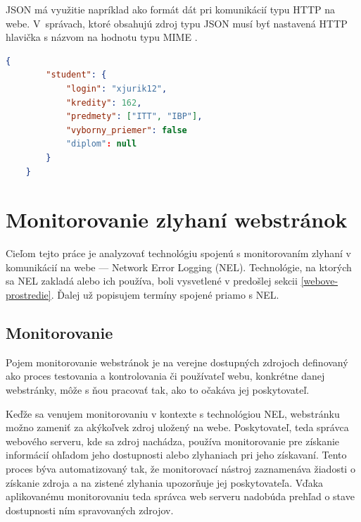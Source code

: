 JSON má využitie napríklad ako formát dát pri komunikácií typu HTTP na webe.
\mbox{V správach}, ktoré obsahujú zdroj typu JSON musí byť nastavená HTTP hlavička s názvom  na hodnotu typu MIME .

\begin{center}
\centering
\begin{lstlisting}[caption={\centering Príklad dokumentu JSON. Položka \code{"student"} predstavuje JSON kľúč, ktorého hodnotou je štruktúrovaný dátový typ objekt. Názornú ukážku dátového typu pole predstavuje hodnota priradená kľúču \code{"predmety"}.},
label=listing:priklad-dokumentu-json, 
language=json, 
frame=tb,
xleftmargin=.15\textwidth, 
xrightmargin=.15\textwidth]
    {       
        "student": {
            "login": "xjurik12",
            "kredity": 162,
            "predmety": ["ITT", "IBP"],
            "vyborny_priemer": false
            "diplom": null
        }
    }
\end{lstlisting}
\end{center}


\section{Monitorovanie zlyhaní webstránok}

Cieľom tejto práce je analyzovať technológiu spojenú s monitorovaním zlyhaní v komunikácií 
na webe --- Network Error Logging (NEL).
Technológie, na ktorých sa NEL zakladá alebo ich používa, boli vysvetlené v predošlej sekcii \ref{webove-prostredie}.
Ďalej už popisujem termíny spojené priamo s NEL.

\subsection{Monitorovanie}
\label{monitorovanie}

Pojem monitorovanie webstránok je na verejne dostupných zdrojoch definovaný ako proces testovania a kontrolovania či používateľ webu, konkrétne danej webstránky, môže s ňou pracovať tak, ako to očakáva jej poskytovateľ. 

Keďže sa venujem monitorovaniu v kontexte s technológiou NEL, webstránku možno zameniť za akýkoľvek zdroj uložený na webe.
Poskytovateľ, teda správca webového serveru, kde sa zdroj nachádza, používa monitorovanie pre získanie informácií ohľadom jeho dostupnosti alebo zlyhaniach pri jeho získavaní.
Tento proces býva automatizovaný tak, že monitorovací nástroj zaznamenáva žiadosti o získanie zdroja a na zistené zlyhania upozorňuje jej poskytovateľa.  
Vďaka aplikovanému monitorovaniu teda správca web serveru nadobúda prehľad o stave dostupnosti ním spravovaných zdrojov.

